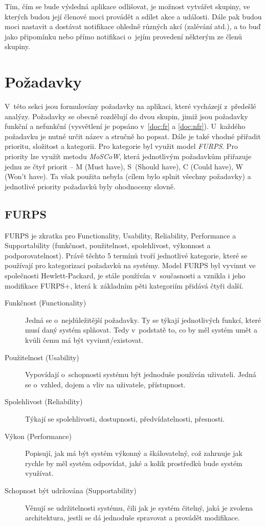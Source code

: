 \documentclass[thesis=M,czech]{FITthesis}[2019/12/23]
\begin{document}
Tím, čím se bude výsledná aplikace odlišovat, je možnost vytvářet skupiny, ve kterých budou její členové moci provádět a sdílet akce a události. Dále pak budou moci nastavit a dostávat notifikace ohledně různých akcí (zalévání atd.), a to buď jako připomínku nebo přímo notifikaci o~jejím provedení některým ze členů skupiny.

\section{Požadavky}
V~této sekci jsou formulovány požadavky na aplikaci, které vycházejí z~předešlé analýzy. Požadavky se obecně rozdělují do dvou skupin, jimiž jsou požadavky funkční a nefunkční (vysvětlení je popsáno v~\ref{doc:fr} a \ref{doc:nfr}). U~každého požadavku je nutné určit název a stručně ho popsat. Dále je také vhodné přiřadit prioritu, složitost a kategorii. Pro kategorie byl využit model \textit{FURPS}. Pro priority lze využít metodu \textit{MoSCoW}, která jednotlivým požadavkům přiřazuje jednu ze čtyř priorit -- M (Must have), S~(Should have), C (Could have), W (Won't have). Ta však použita nebyla (cílem bylo splnit všechny požadavky) a jednotlivé priority požadavků byly ohodnoceny slovně.

\subsection{FURPS \cite{furps}}
FURPS je zkratka pro Functionality, Usability, Reliability, Performance a Supportability (funkčnost, použitelnost, spolehlivost, výkonnost a podporovatelnost). Právě těchto 5 termínů tvoří jednotlivé kategorie, které se používají pro kategorizaci požadavků na systémy. Model FURPS byl vyvinut ve společnosti Hewlett-Packard, je stále používán v~současnosti a vznikla i jeho modifikace FURPS+, která k~základním pěti kategoriím přidává čtyři další.

\begin{description}
    \item[Funkčnost (Functionality)] Jedná se o~nejdůležitější požadavky. Ty se týkají jednotlivých funkcí, které musí daný systém splňovat. Tedy v~podstatě to, co by měl systém umět a kvůli čemu má být vyvinut/existovat.
    \item[Použitelnost (Usability)] Vypovídají o~schopnosti systému být jednoduše používán uživateli. Jedná se o~vzhled, dojem a vliv na uživatele, přístupnost.
    \item[Spolehlivost (Reliability)] Týkají se spolehlivosti, dostupnosti, předvídatelnosti, přesnosti.
    \item[Výkon (Performance)] Popisují, jak má být systém výkonný a škálovatelný, což zahrnuje jak rychle by měl systém odpovídat, jaké a kolik prostředků bude systém využívat.
    \item[Schopnost být udržována (Supportability)] Věnují se udržitelnosti systému, čili jak je systém čitelný, jaká je zvolena architektura, jestli se dá jednoduše spravovat a provádět modifikace.
\end{description}
\end{document}
